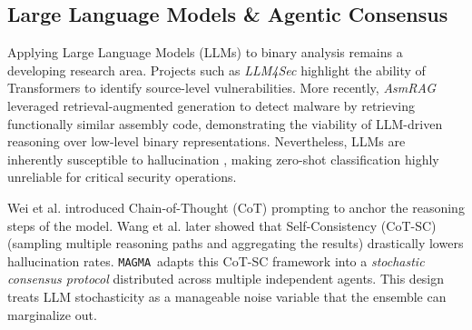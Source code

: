 \documentclass[pdflatex,sn-mathphys-num]{sn-jnl}
\newcommand{\sysname}{\texttt{MAGMA}~}
\begin{document}
\subsection{Large Language Models \& Agentic Consensus}
Applying Large Language Models (LLMs) to binary analysis remains a developing research area. Projects such as \textit{LLM4Sec} \cite{PearceHammond2022Asleep} highlight the ability of Transformers to identify source-level vulnerabilities. More recently, \textit{AsmRAG} \cite{karbab2026asmragllmdrivenmalwaredetection} leveraged retrieval-augmented generation to detect malware by retrieving functionally similar assembly code, demonstrating the viability of LLM-driven reasoning over low-level binary representations. Nevertheless, LLMs are inherently susceptible to hallucination \cite{Bender2021Stochastic}, making zero-shot classification highly unreliable for critical security operations.

Wei et al. \cite{Wei2022Chain} introduced Chain-of-Thought (CoT) prompting to anchor the reasoning steps of the model. Wang et al. \cite{Wang2022Self} later showed that Self-Consistency (CoT-SC) (sampling multiple reasoning paths and aggregating the results) drastically lowers hallucination rates. \sysname adapts this CoT-SC framework into a \textit{stochastic consensus protocol} distributed across multiple independent agents. This design treats LLM stochasticity as a manageable noise variable that the ensemble can marginalize out.
\end{document}
